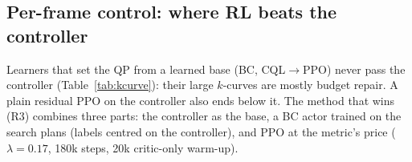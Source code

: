 \documentclass[conference]{IEEEtran}
\begin{document}
\begin{table}[t]
\caption{Per-GOP test score $S$ (dB) by lookahead $k$, clip-level (two-pass) budgets. 0 = best constant QP in hindsight. Lower block: share of the search's gain over the encoder's ABR+VBV that each method captures, $(S-S_{\mathrm{ABR}})/(S_{\mathrm{search}}-S_{\mathrm{ABR}})$, with $S_{\mathrm{ABR}}$ at the middle of its range ($\pm1$ point). Learners: 3 seeds. Budget-level-24 episodes beyond the QP-18 spend included.}
\label{tab:kcurve}
\centering\footnotesize\setlength{\tabcolsep}{3.2pt}
\end{table}

\subsection{Per-frame control: where RL beats the controller}
Learners that set the QP from a learned base (BC, CQL$\to$PPO) never pass the controller (Table~\ref{tab:kcurve}): their large $k$-curves are mostly budget repair. A plain residual PPO on the controller also ends below it. The method that wins (R3) combines three parts: the controller as the base, a BC actor trained on the search plans (labels centred on the controller), and PPO at the metric's price ($\lambda{=}0.17$, 180k steps, 20k critic-only warm-up).
\end{document}
